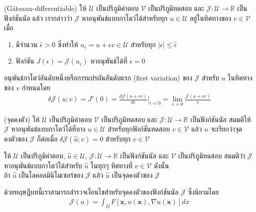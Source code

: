 \begin{Definition}
    (G\^{a}teaux-differentiable)
    ให้ $\mathcal{U}$ เป็นปริภูมิคำตอบ $\mathcal{V}$ เป็นปริภูมิทดสอบ และ $\mathcal{J} : \mathcal{U} \rightarrow \mathbb{R}$ เป็นฟังก์ชันนัล แล้ว เรากล่าวว่า $\mathcal{J}$ หาอนุพันธ์แบบกาโตว์ได้สำหรับทุก $u \in \mathcal{U}$ อยู่ในทิศทางของ $v \in \mathcal{V}$ เมื่อ
    \begin{enumerate}
        \item มีจำนวน $\hat{\epsilon} > 0$ ซึ่งทำให้ $u_{\epsilon} = u + \epsilon v \in \mathcal{U}$ สำหรับทุก $|\epsilon| \leq \hat{\epsilon}$
        \item ฟังก์ชัน $J(\epsilon) = \mathcal{J}(u_\epsilon)$ หาอนุพันธ์ได้ที่ $\epsilon = 0$
    \end{enumerate}
    อนุพันธ์กาโตว์อันดับหนึ่งหรือการแปรผันอันดับแรก (first variation) ของ $\mathcal{J}$ สำหรับ $u$ ในทิศทางของ $v$ กำหนดโดย
    \begin{align*}
        \delta \mathcal{J}(u;v) =J'(0) = \frac{d\mathcal{J}(u + \epsilon v)}{d \epsilon} \Big|_{\epsilon = 0} = \lim_{\epsilon = 0}\frac{\mathcal{J}(u + \epsilon v)}{\epsilon} 
    \end{align*}
\end{Definition}

\begin{Definition}
(จุดคงตัว) ให้ $\mathcal{U}$ เป็นปริภูมิคำตอบ $\mathcal{V}$ เป็นปริภูมิทดสอบ และ $\mathcal{J} : \mathcal{U} \rightarrow \mathbb{R}$ เป็นฟังก์ชันนัล สมมติให้ $\mathcal{J}$ หาอนุพันธ์แบบกาโตว์ได้ที่บาง $\hat{u} \in \mathcal{U}$ สำหรับทุกฟังก์ชันทดสอบ $v \in \mathcal{V}$ แล้ว $\hat{u}$ จะเรียกว่าจุดคงตัวของ $\mathcal{J}$ ก็ต่อเมื่อ $\delta\mathcal{J}(\hat{u};v) = 0$ สำหรับทุก $v \in \mathcal{V}$
\end{Definition}

\begin{Theorem}
    ให้ $\mathcal{U}$ เป็นปริภูมิคำตอบ, $\hat{u} \in \mathcal{U}$, $\mathcal{J} : \mathcal{U} \rightarrow \mathbb{R}$ เป็นฟังก์ชันนัล และ $\mathcal{V}$ เป็นปริภูมิทดสอบ สมมติว่า $\mathcal{J}$ หาอนุพันธ์แบบกาโตว์ได้สำหรับ $\hat{u}$ ในทุกๆ ทิศทางที่ $v \in \mathcal{V}$ ดังนั้น \\
    \hspace*{1cm} ถ้า $\hat{u}$ เป็นโลคอลมินิไมเซอร์ของ $\mathcal{J}$ แล้ว $\hat{u}$ เป็นจุดคงตัวของ  $\mathcal{J}$ 
    \label{theroem:nessery_minimizer}
\end{Theorem}
\hspace{1cm} ด้วยทฤษฎีบทนี้เราสามารถสำรวจเงื่อนไขสำหรับจุดคงตัวของฟังก์ชันนัล $\mathcal{J}$ ซึ่งนิยามโดย
\begin{align}
    \mathcal{J}(u) = \int_{\Omega} F[\boldsymbol{x},u(\boldsymbol{x}),\nabla u(\boldsymbol{x})] dx
    \label{equation:general_functional}
\end{align}

